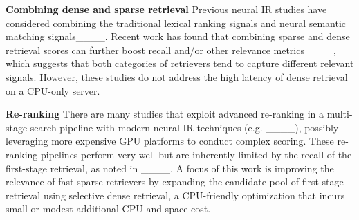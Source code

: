 \textbf{Combining  dense and sparse retrieval}
Previous neural IR studies  have  considered combining the traditional lexical ranking signals and neural semantic matching signals____. 
Recent work has found that combining  sparse and dense retrieval scores  
can further boost recall and/or other relevance metrics____, which
suggests  that both categories  of retrievers tend to capture  different relevant signals. However, these studies do not address the high  latency  of
dense retrieval on a CPU-only server.
%

\textbf{Re-ranking} 
There  are many studies that exploit advanced re-ranking in a multi-stage search pipeline with modern
neural IR techniques (e.g. ____),
possibly leveraging more expensive GPU platforms to conduct complex scoring.
These  re-ranking pipelines perform very well but are inherently limited by the recall of the first-stage retrieval,
as noted in  ____. 
A focus of this work is improving the relevance of fast sparse retrievers by expanding the candidate pool of first-stage retrieval using 
selective dense retrieval, a CPU-friendly optimization that incurs small or modest additional CPU and space cost.

